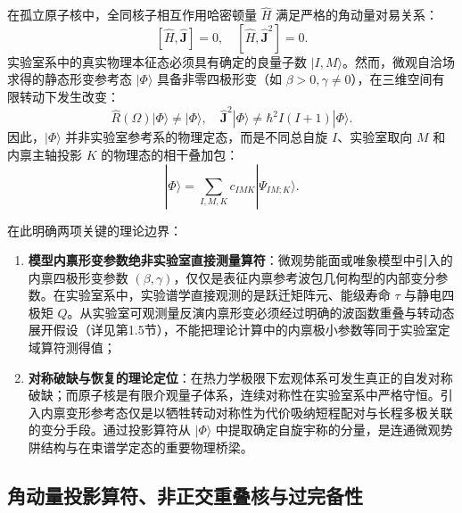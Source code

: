 在孤立原子核中，全同核子相互作用哈密顿量 $\hat{H}$ 满足严格的角动量对易关系：
\begin{equation}\label{eq:2-5-H-J-commute}
[\hat{H}, \hat{\mathbf{J}}] = 0, \quad [\hat{H}, \hat{\mathbf{J}}^2] = 0.
\end{equation}
实验室系中的真实物理本征态必须具有确定的良量子数 $|I, M\rangle$。然而，微观自洽场求得的静态形变参考态 $|\Phi\rangle$ 具备非零四极形变（如 $\beta > 0, \gamma \ne 0$），在三维空间有限转动下发生改变：
\begin{equation}\label{eq:2-5-broken-state}
\hat{R}(\Omega) |\Phi\rangle \ne |\Phi\rangle, \quad \hat{\mathbf{J}}^2 |\Phi\rangle \ne \hbar^2 I(I+1) |\Phi\rangle.
\end{equation}
因此，$|\Phi\rangle$ 并非实验室参考系的物理定态，而是不同总自旋 $I$、实验室取向 $M$ 和内禀主轴投影 $K$ 的物理态的相干叠加包：
\begin{equation}\label{eq:2-5-superposition}
|\Phi\rangle = \sum_{I, M, K} c_{IMK} |\Psi_{IM; K}\rangle.
\end{equation}

在此明确两项关键的理论边界：
\begin{enumerate}
\item \textbf{模型内禀形变参数绝非实验室直接测量算符}：微观势能面或唯象模型中引入的内禀四极形变参数 $(\beta, \gamma)$，仅仅是表征内禀参考波包几何构型的内部变分参数。在实验室系中，实验谱学直接观测的是跃迁矩阵元、能级寿命 $\tau$ 与静电四极矩 $Q$。从实验室可观测量反演内禀形变必须经过明确的波函数重叠与转动态展开假设（详见第1.5节），不能把理论计算中的内禀极小参数等同于实验室定域算符测得值；
\item \textbf{对称破缺与恢复的理论定位}：在热力学极限下宏观体系可发生真正的自发对称破缺；而原子核是有限介观量子体系，连续对称性在实验室系中严格守恒。引入内禀变形参考态仅是以牺牲转动对称性为代价吸纳短程配对与长程多极关联的变分手段。通过投影算符从 $|\Phi\rangle$ 中提取确定自旋宇称的分量，是连通微观势阱结构与在束谱学定态的重要物理桥梁。
\end{enumerate}

\subsection{角动量投影算符、非正交重叠核与过完备性}\label{sec:2-5-2}

